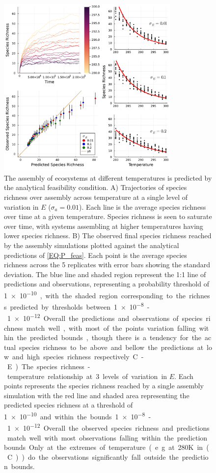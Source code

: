 \documentclass{article}
\begin{document}
\begin{figure}
    \centering
    \includegraphics[width = 0.8\textwidth]{docs/Figures/Fig_4.pdf}
    \caption{The assembly of ecosystems at different temperatures is predicted by the analytical feasibility condition. A) Trajectories of species richness over assembly across temperature at a single level of variation in $E$ ($\sigma_a = 0.01$). Each line is the average species richness over time at a given temperature. Species richness is seen to saturate over time, with systems assembling at higher temperatures having lower species richness. B) The observed final species richness reached by the assembly simulations plotted against the analytical predictions of \cref{EQ:P_feas}. Each point is the average species richness across the 5 replicates with error bars showing the standard deviation. The blue line and shaded region represent the 1:1 line of predictions and observations, representing a probability threshold of \SI{1e-10}, with the shaded region corresponding to the richness predicted by thresholds between \SI{1e-8}-\SI{1e-12}. Overall the predictions and observations of species richness match well, with most of the points variation falling within the predicted bounds, though there is a tendency for the actual species richness to be above and bellow the predictions at low and high species richness respectively. C-E) The species richness - temperature relationship at 3 levels of variation in $E$. Each points represents the species richness reached by a single assembly simulation with the red line and shaded area representing the predicted species richness at a threshold of \SI{1e-10} and within the bounds \SI{1e-8}-\SI{1e-12}. Overall the observed species richness and predictions match well with most observations falling within the prediction bounds. Only at the extremes of temperature (e.g. at 280K in (C)) do the observations significantly fall outside the prediction bounds.}
    \label{Fig:Temperature_assembly}
\end{figure}
\end{document}
